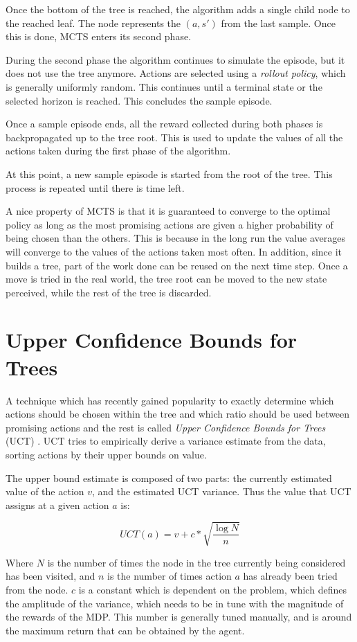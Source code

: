 Once the bottom of the tree is reached, the algorithm adds a single child node to the reached leaf.
The node represents the $(a,s')$ from the last sample. Once this is done, MCTS enters its
second phase.

During the second phase the algorithm continues to simulate the episode, but it does not use the
tree anymore. Actions are selected using a \textit{rollout policy}, which is generally uniformly
random. This continues until a terminal state or the selected horizon is reached. This concludes the
sample episode.

Once a sample episode ends, all the reward collected during both phases is backpropagated up to the
tree root. This is used to update the values of all the actions taken during the first phase of the
algorithm.

At this point, a new sample episode is started from the root of the tree. This process is repeated
until there is time left.

A nice property of MCTS is that it is guaranteed to converge to the optimal policy as long as the
most promising actions are given a higher probability of being chosen than the others. This is
because in the long run the value averages will converge to the values of the actions taken most
often.  In addition, since it builds a tree, part of the work done can be reused on the next time
step. Once a move is tried in the real world, the tree root can be moved to the new state perceived,
while the rest of the tree is discarded.

\section{Upper Confidence Bounds for Trees}

A technique which has recently gained popularity to exactly determine which actions should be chosen
within the tree and which ratio should be used between promising actions and the rest is called
\textit{Upper Confidence Bounds for Trees} (UCT) \cite{cit:uct}. UCT tries to empirically derive a
variance estimate from the data, sorting actions by their upper bounds on value.

The upper bound estimate is composed of two parts: the currently estimated value of the action $v$,
and the estimated UCT variance. Thus the value that UCT assigns at a given action $a$ is:

\[ UCT(a) = v + c*\sqrt{\frac{\log{N}}{n}} \]

Where $N$ is the number of times the node in the tree currently being considered has been visited,
and $n$ is the number of times action $a$ has already been tried from the node. $c$ is a constant
which is dependent on the problem, which defines the amplitude of the variance, which needs to be in
tune with the magnitude of the rewards of the MDP. This number is generally tuned manually, and is
around the maximum return that can be obtained by the agent.

